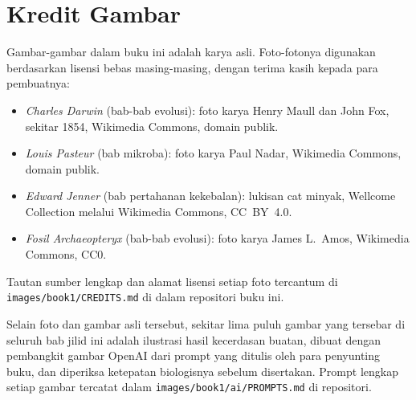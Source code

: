 \chapter*{Kredit Gambar}

Gambar-gambar dalam buku ini adalah karya asli. Foto-fotonya digunakan
berdasarkan lisensi bebas masing-masing, dengan terima kasih kepada
para pembuatnya:

\begin{itemize}
  \item \emph{Charles Darwin} (bab-bab evolusi): foto karya Henry
        Maull dan John Fox, sekitar 1854, Wikimedia Commons,
        domain publik.
  \item \emph{Louis Pasteur} (bab mikroba): foto karya Paul Nadar,
        Wikimedia Commons, domain publik.
  \item \emph{Edward Jenner} (bab pertahanan kekebalan):
        lukisan cat minyak, Wellcome Collection melalui Wikimedia
        Commons, CC~BY~4.0.
  \item \emph{Fosil Archaeopteryx} (bab-bab evolusi): foto karya
        James L.~Amos, Wikimedia Commons, CC0.
\end{itemize}

Tautan sumber lengkap dan alamat lisensi setiap foto tercantum di
\texttt{images/book1/CREDITS.md} di dalam repositori buku ini.

\bigskip
Selain foto dan gambar asli tersebut, sekitar lima puluh gambar yang
tersebar di seluruh bab jilid ini adalah ilustrasi hasil kecerdasan
buatan, dibuat dengan pembangkit gambar OpenAI dari prompt yang ditulis
oleh para penyunting buku, dan diperiksa ketepatan biologisnya sebelum
disertakan. Prompt lengkap setiap gambar tercatat dalam
\texttt{images/book1/ai/PROMPTS.md} di repositori.
\clearpage
